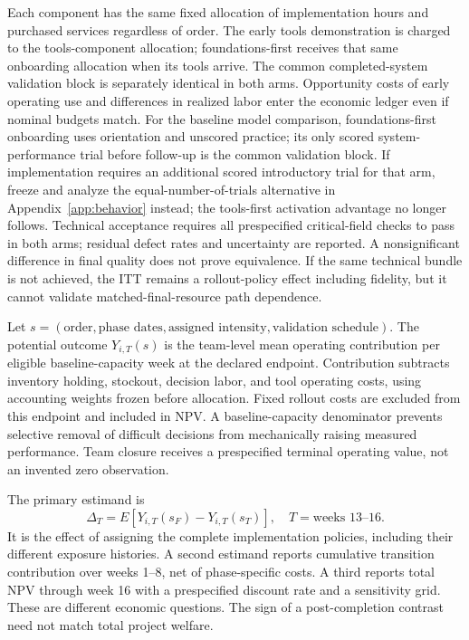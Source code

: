 \documentclass[11pt]{article}
\begin{document}
Each component has the same fixed allocation of implementation hours and purchased services regardless of order. The early tools demonstration is charged to the tools-component allocation; foundations-first receives that same onboarding allocation when its tools arrive. The common completed-system validation block is separately identical in both arms. Opportunity costs of early operating use and differences in realized labor enter the economic ledger even if nominal budgets match. For the baseline model comparison, foundations-first onboarding uses orientation and unscored practice; its only scored system-performance trial before follow-up is the common validation block. If implementation requires an additional scored introductory trial for that arm, freeze and analyze the equal-number-of-trials alternative in Appendix~\ref{app:behavior} instead; the tools-first activation advantage no longer follows. Technical acceptance requires all prespecified critical-field checks to pass in both arms; residual defect rates and uncertainty are reported. A nonsignificant difference in final quality does not prove equivalence. If the same technical bundle is not achieved, the ITT remains a rollout-policy effect including fidelity, but it cannot validate matched-final-resource path dependence.

Let $s=(\text{order},\text{phase dates},\text{assigned intensity},\text{validation schedule})$. The potential outcome $Y_{i,T}(s)$ is the team-level mean operating contribution per eligible baseline-capacity week at the declared endpoint. Contribution subtracts inventory holding, stockout, decision labor, and tool operating costs, using accounting weights frozen before allocation. Fixed rollout costs are excluded from this endpoint and included in NPV. A baseline-capacity denominator prevents selective removal of difficult decisions from mechanically raising measured performance. Team closure receives a prespecified terminal operating value, not an invented zero observation.

The primary estimand is
\begin{equation}
 \Delta_T=E[Y_{i,T}(s_F)-Y_{i,T}(s_T)],\quad T=\text{weeks 13--16}.
\end{equation}
It is the effect of assigning the complete implementation policies, including their different exposure histories. A second estimand reports cumulative transition contribution over weeks 1--8, net of phase-specific costs. A third reports total NPV through week 16 with a prespecified discount rate and a sensitivity grid. These are different economic questions. The sign of a post-completion contrast need not match total project welfare.
\end{document}
